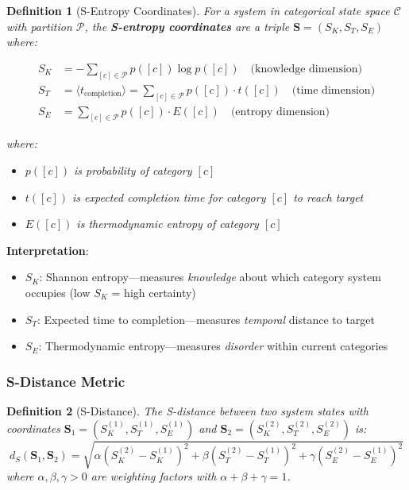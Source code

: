 \documentclass[11pt,a4paper]{article}
\newtheorem{definition}{Definition}[section]
\begin{document}
\begin{definition}[S-Entropy Coordinates]
\label{def:s_coordinates}
For a system in categorical state space $\mathcal{C}$ with partition $\mathcal{P}$, the \textbf{S-entropy coordinates} are a triple $\mathbf{S} = (S_K, S_T, S_E)$ where:

\begin{align}
S_K &= -\sum_{[c] \in \mathcal{P}} p([c]) \log p([c]) \quad \text{(knowledge dimension)} \\
S_T &= \langle t_{\text{completion}} \rangle = \sum_{[c] \in \mathcal{P}} p([c]) \cdot t([c]) \quad \text{(time dimension)} \\
S_E &= \sum_{[c] \in \mathcal{P}} p([c]) \cdot E([c]) \quad \text{(entropy dimension)}
\end{align}

where:
\begin{itemize}
\item $p([c])$ is probability of category $[c]$
\item $t([c])$ is expected completion time for category $[c]$ to reach target
\item $E([c])$ is thermodynamic entropy of category $[c]$
\end{itemize}
\end{definition}

\textbf{Interpretation}:
\begin{itemize}
\item $S_K$: Shannon entropy—measures \textit{knowledge} about which category system occupies (low $S_K$ = high certainty)
\item $S_T$: Expected time to completion—measures \textit{temporal} distance to target
\item $S_E$: Thermodynamic entropy—measures \textit{disorder} within current categories
\end{itemize}

\subsubsection{S-Distance Metric}

\begin{definition}[S-Distance]
The S-distance between two system states with coordinates $\mathbf{S}_1 = (S_K^{(1)}, S_T^{(1)}, S_E^{(1)})$ and $\mathbf{S}_2 = (S_K^{(2)}, S_T^{(2)}, S_E^{(2)})$ is:
\begin{equation}
d_S(\mathbf{S}_1, \mathbf{S}_2) = \sqrt{\alpha (S_K^{(2)} - S_K^{(1)})^2 + \beta (S_T^{(2)} - S_T^{(1)})^2 + \gamma (S_E^{(2)} - S_E^{(1)})^2}
\end{equation}
where $\alpha, \beta, \gamma > 0$ are weighting factors with $\alpha + \beta + \gamma = 1$.
\end{definition}
\end{document}
